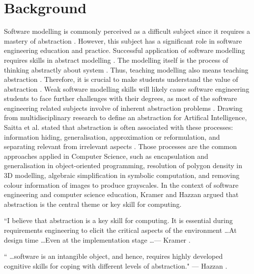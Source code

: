 \documentclass[12pt, a4paper]{report} \usepackage[titletoc]{appendix}
\begin{document}
\section{Background}
Software modelling is commonly perceived as a difficult subject since it
requires a mastery of abstraction \cite{Borstler2012}. However, this subject has a significant role in software engineering education and
practice. Successful application of software modelling requires skills in
abstract modelling \cite{whittle2013industrial}. The modelling itself is the process of thinking abstractly about system \cite{bezivin2009teaching}. Thus, teaching modelling also means teaching abstraction \cite{engels2005teaching}. Therefore, it is crucial to make students understand the value of abstraction \cite{bezivin2009teaching}. Weak software modelling skills will likely cause software engineering students to face further challenges with their degrees, as most of the software engineering related subjects involve of inherent abstraction problems \cite{Kramer2007}. Drawing from multidisciplinary research to define an abstraction for Artifical Intelligence, Saitta et al. stated that abstraction is often associated with these processes: information hiding, generalisation, approximation or reformulation, and separating relevant from irrelevant aspects \cite{Saitta2013}. Those processes are the common approaches applied in Computer Science, such as encapsulation and generalisation in object-oriented programming, resolution of polygon density in 3D modelling, algebraic simplification in symbolic computation, and removing colour information of images to produce grayscales. In the context of software engineering and computer science education, Kramer \cite{Kramer2007} and Hazzan \cite{hazzan2008reflections} argued that abstraction is the central theme or key skill for computing.

\begin{displayquote}
``I believe that abstraction is a key skill for computing. It is essential
during requirements engineering to elicit the critical aspects of the 
environment \dots At design time \dots Even at the implementation stage
\dots --- Kramer \cite{Kramer2007}.
\end{displayquote}

\begin{displayquote}
`` \dots software is an intangible object, and hence, requires highly developed
cognitive skills for coping with different levels of abstraction." --- Hazzan
\cite{hazzan2008reflections}.
\end{displayquote}
\end{document}
